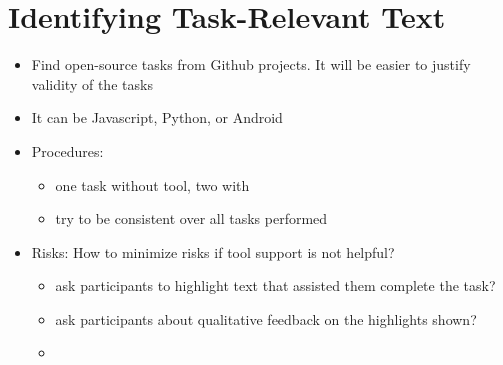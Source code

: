 \setcounter{chapter}{5}
\setcounter{rq}{1}


\chapter{Identifying Task-Relevant Text}
\label{ch:assisting}






\begin{itemize}
    \item Find open-source tasks from Github projects. It will be easier to justify validity of the tasks
    \item It can be Javascript, Python, or Android
    \item Procedures: 
    \begin{itemize}
        \item one task without tool, two with 
        \item try to be consistent over all tasks performed
    \end{itemize}
    \item Risks: How to minimize risks if tool support is not helpful?
    \begin{itemize}
        \item ask participants to highlight text that assisted them complete the task?
        \item ask participants about qualitative feedback on the highlights shown?
        \item {}
    \end{itemize}
\end{itemize}



